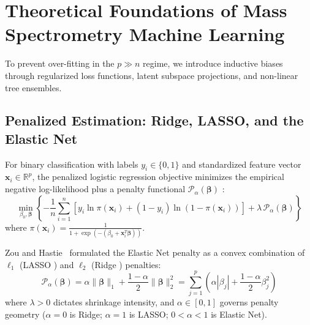 \documentclass[11pt,oneside]{book}
\begin{document}
\clearpage

\section{Theoretical Foundations of Mass Spectrometry Machine Learning}

To prevent over-fitting in the $p \gg n$ regime, we introduce inductive biases through regularized loss functions, latent subspace projections, and non-linear tree ensembles.

\subsection{Penalized Estimation: Ridge, LASSO, and the Elastic Net}

For binary classification with labels $y_i \in \{0, 1\}$ and standardized feature vector $\mathbf{x}_i \in \mathbb{R}^p$, the penalized logistic regression objective minimizes the empirical negative log-likelihood plus a penalty functional $\mathcal{P}_\alpha(\boldsymbol{\beta})$ \cite{hoerl1970ridge, tibshirani1996regression}:
\begin{equation}
\label{eq:penalized_objective}
\min_{\beta_0, \boldsymbol{\beta}} \left\{ -\frac{1}{n} \sum_{i=1}^n \left[ y_i \ln \pi(\mathbf{x}_i) + (1 - y_i) \ln(1 - \pi(\mathbf{x}_i)) \right] + \lambda \, \mathcal{P}_\alpha(\boldsymbol{\beta}) \right\}
\end{equation}
where $\pi(\mathbf{x}_i) = \frac{1}{1 + \exp(-(\beta_0 + \mathbf{x}_i^T \boldsymbol{\beta}))}$.

Zou and Hastie~\cite{zou2005regularization} formulated the Elastic Net penalty as a convex combination of $\ell_1$ (LASSO \cite{tibshirani1996regression}) and $\ell_2$ (Ridge \cite{hoerl1970ridge}) penalties:
\begin{equation}
\label{eq:elastic_net_penalty}
\mathcal{P}_\alpha(\boldsymbol{\beta}) = \alpha \|\boldsymbol{\beta}\|_1 + \frac{1 - \alpha}{2} \|\boldsymbol{\beta}\|_2^2 = \sum_{j=1}^p \left( \alpha |\beta_j| + \frac{1 - \alpha}{2} \beta_j^2 \right)
\end{equation}
where $\lambda > 0$ dictates shrinkage intensity, and $\alpha \in [0, 1]$ governs penalty geometry ($\alpha = 0$ is Ridge; $\alpha = 1$ is LASSO; $0 < \alpha < 1$ is Elastic Net).
\end{document}
